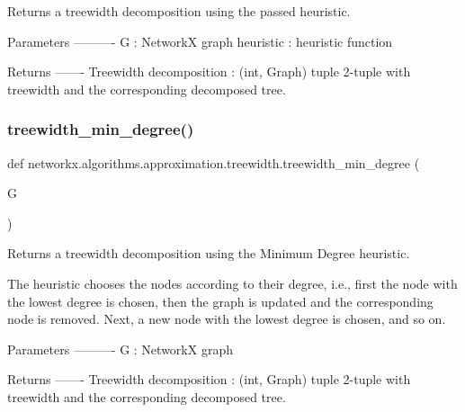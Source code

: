 \begin{DoxyVerb}Returns a treewidth decomposition using the passed heuristic.

Parameters
----------
G : NetworkX graph
heuristic : heuristic function

Returns
-------
Treewidth decomposition : (int, Graph) tuple
    2-tuple with treewidth and the corresponding decomposed tree.
\end{DoxyVerb}
 \mbox{\label{namespacenetworkx_1_1algorithms_1_1approximation_1_1treewidth_a61fc0c9223a43796cfaca14a69fe0a8c}} 
\subsubsection{\texorpdfstring{treewidth\+\_\+min\+\_\+degree()}{treewidth\_min\_degree()}}
{\footnotesize\ttfamily def networkx.\+algorithms.\+approximation.\+treewidth.\+treewidth\+\_\+min\+\_\+degree (\begin{DoxyParamCaption}\item[{}]{G }\end{DoxyParamCaption})}

\begin{DoxyVerb}Returns a treewidth decomposition using the Minimum Degree heuristic.

The heuristic chooses the nodes according to their degree, i.e., first
the node with the lowest degree is chosen, then the graph is updated
and the corresponding node is removed. Next, a new node with the lowest
degree is chosen, and so on.

Parameters
----------
G : NetworkX graph

Returns
-------
Treewidth decomposition : (int, Graph) tuple
      2-tuple with treewidth and the corresponding decomposed tree.
\end{DoxyVerb}
 \mbox{\label{namespacenetworkx_1_1algorithms_1_1approximation_1_1treewidth_a80f9b50c25683439899cf76c8b7baeca}} 
